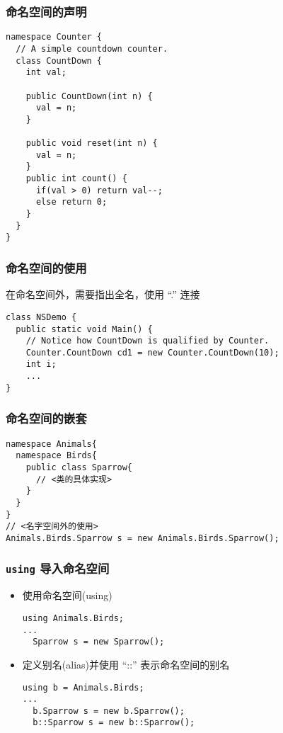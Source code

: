 \begin{frame}[fragile]
\frametitle{命名空间的声明}
\begin{lstlisting}
namespace Counter {
  // A simple countdown counter.
  class CountDown {
    int val;

    public CountDown(int n) {
      val = n;
    }

    public void reset(int n) {
      val = n;
    }
    public int count() {
      if(val > 0) return val--;
      else return 0;
    }
  }
}
\end{lstlisting}
\end{frame}

\begin{frame}[fragile]
\frametitle{命名空间的使用}
在命名空间外，需要指出全名，使用 ``.'' 连接
\begin{lstlisting}
class NSDemo {
  public static void Main() {
    // Notice how CountDown is qualified by Counter.
    Counter.CountDown cd1 = new Counter.CountDown(10);
    int i;
    ...
}
\end{lstlisting}
\end{frame}

\begin{frame}[fragile]
\frametitle{命名空间的嵌套}
\begin{lstlisting}[escapeinside=<>]
namespace Animals{
  namespace Birds{
    public class Sparrow{
      // <类的具体实现>
    }
  }
}
// <名字空间外的使用>
Animals.Birds.Sparrow s = new Animals.Birds.Sparrow();
\end{lstlisting}
\end{frame}

\begin{frame}[fragile]
\frametitle{\texttt{using} 导入命名空间}

\begin{itemize}
\item 使用命名空间(using)
\begin{lstlisting}
using Animals.Birds;
...
  Sparrow s = new Sparrow();
\end{lstlisting}
\item 定义别名(alias)并使用 ``::'' 表示命名空间的别名
\begin{lstlisting}
using b = Animals.Birds;
...
  b.Sparrow s = new b.Sparrow();
  b::Sparrow s = new b::Sparrow();
\end{lstlisting}
\end{itemize}
\end{frame}

